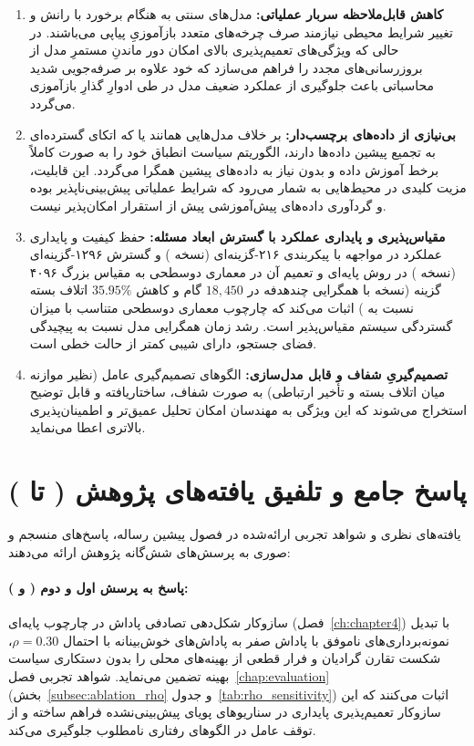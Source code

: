 \documentclass[oneside,openany,phd]{TMU-Thesis}
\begin{document}
\begin{enumerate}
  \item \textbf{کاهش قابل‌ملاحظه سربار عملیاتی:} مدل‌های سنتی به هنگام برخورد با رانش و تغییر شرایط محیطی نیازمند صرف چرخه‌های متعدد بازآموزیِ پیاپی می‌باشند. در حالی که ویژگی‌های تعمیم‌پذیری بالای  امکان دور ماندنِ مستمرِ مدل از بروزرسانی‌های مجدد را فراهم می‌سازد که خود علاوه بر صرفه‌جویی شدید محاسباتی باعث جلوگیری از عملکرد ضعیف مدل در طی ادوارِ گذارِ بازآموزی می‌گردد.
  \item \textbf{بی‌نیازی از داده‌های برچسب‌دار:} بر خلاف مدل‌هایی همانند  یا  که اتکای گسترده‌ای به تجمیع پیشین داده‌ها دارند، الگوریتم  سیاست انطباق خود را به صورت کاملاً برخط آموزش داده و بدون نیاز به داده‌های پیشین همگرا می‌گردد. این قابلیت، مزیت کلیدی در محیط‌هایی به شمار می‌رود که شرایط عملیاتی پیش‌بینی‌ناپذیر بوده و گردآوری داده‌های پیش‌آموزشی پیش از استقرار امکان‌پذیر نیست.
  \item \textbf{مقیاس‌پذیری و پایداری عملکرد با گسترش ابعاد مسئله:} حفظ کیفیت و پایداری عملکرد در مواجهه با پیکربندی ۲۱۶-گزینه‌ای (نسخه ) و گسترش ۱۲۹۶-گزینه‌ای (نسخه ) در روش پایه‌ای  و تعمیم آن در معماری دوسطحی \rsdrlplus به مقیاس بزرگ ۴۰۹۶ گزینه (نسخه  با همگرایی چندهدفه در $18{,}450$ گام و کاهش $35.95\%$ اتلاف بسته نسبت به ) اثبات می‌کند که چارچوب معماری دوسطحی متناسب با میزان گستردگی سیستم مقیاس‌پذیر است. رشد زمان همگرایی مدل نسبت به پیچیدگی فضای جستجو، دارای شیبی کمتر از حالت خطی است.
  \item \textbf{تصمیم‌گیریِ شفاف و قابل مدل‌سازی:} الگوهای تصمیم‌گیری عامل (نظیر موازنه میان اتلاف بسته و تأخیر ارتباطی) به صورت شفاف، ساختاریافته و قابل توضیح استخراج می‌شوند که این ویژگی به مهندسان امکان تحلیل عمیق‌تر و اطمینان‌پذیری بالاتری اعطا می‌نماید.
\end{enumerate}

\section{پاسخ جامع و تلفیق یافته‌های پژوهش (\texorpdfstring{}{RQ1} تا \texorpdfstring{}{RQ6})}
\label{sec:rq_synthesis_complete}

یافته‌های نظری و شواهد تجربی ارائه‌شده در فصول پیشین رساله، پاسخ‌های منسجم و صوری به پرسش‌های شش‌گانه پژوهش ارائه می‌دهند:

\paragraph{پاسخ به پرسش اول و دوم ( و ):} سازوکار شکل‌دهی تصادفی پاداش در چارچوب پایه‌ای  (فصل~\ref{ch:chapter4}) با تبدیل نمونه‌برداری‌های ناموفق با پاداش صفر به پاداش‌های خوش‌بینانه با احتمال $\rho=0.30$، شکست تقارن گرادیان و فرار قطعی از بهینه‌های محلی را بدون دستکاری سیاست بهینه تضمین می‌نماید. شواهد تجربی فصل~\ref{chap:evaluation} (بخش~\ref{subsec:ablation_rho} و جدول~\ref{tab:rho_sensitivity}) اثبات می‌کنند که این سازوکار تعمیم‌پذیری پایداری در سناریوهای پویای پیش‌بینی‌نشده فراهم ساخته و از توقف عامل در الگوهای رفتاری نامطلوب جلوگیری می‌کند.
\end{document}

